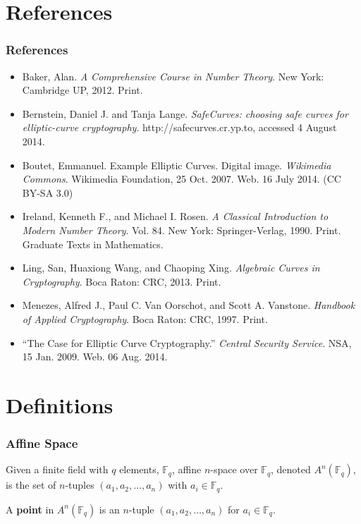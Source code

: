 \documentclass{beamer}
\begin{document}
    \section{References}
    \begin{frame}[allowframebreaks]
        \frametitle{References}
        \begin{itemize}
            \item Baker, Alan. \emph{A Comprehensive Course in Number Theory}.
                New York: Cambridge UP, 2012. Print.
            \item Bernstein, Daniel J. and Tanja Lange. \emph{SafeCurves:
                choosing safe curves for elliptic-curve cryptography}.
                http://safecurves.cr.yp.to, accessed 4 August 2014.
            \item Boutet, Emmanuel. Example Elliptic Curves. Digital image.
                \emph{Wikimedia Commons}.
                Wikimedia Foundation, 25 Oct. 2007.
                Web. 16 July 2014. (CC BY-SA 3.0)
            \item Ireland, Kenneth F., and Michael I. Rosen. \emph{A Classical
                Introduction to Modern Number Theory}. Vol. 84. New York:
                Springer-Verlag, 1990. Print. Graduate Texts in Mathematics.
            \item Ling, San, Huaxiong Wang, and Chaoping Xing. \emph{Algebraic
                Curves in Cryptography}. Boca Raton: CRC, 2013. Print.
            \item Menezes, Alfred J., Paul C. Van Oorschot, and
                Scott A. Vanstone. \emph{Handbook of Applied Cryptography}.
                Boca Raton: CRC, 1997. Print.
            \item ``The Case for Elliptic Curve Cryptography.''
                \emph{Central Security Service}.
                NSA, 15 Jan. 2009. Web. 06 Aug. 2014.
        \end{itemize}
    \end{frame}

    \appendix
    \section{Definitions}
    \begin{frame}[label=definitions]
        \frametitle{Affine Space}
        \begin{definition}
            Given a finite field with \(q\) elements, \(\mathbb{F}_q\),
            affine \(n\)-space over \(\mathbb{F}_q\), denoted
            \(A^n(\mathbb{F}_q)\), is the set of
            \(n\)-tuples \((a_1, a_2, \dots, a_n)\) with
            \(a_i \in \mathbb{F}_q.\)
        \end{definition}
        \vfill
        \begin{definition}
            A \textbf{point} in \(A^n(\mathbb{F}_q)\) is an \(n\)-tuple
            \((a_1, a_2, \dots, a_n)\) for \(a_i \in \mathbb{F}_q\).
        \end{definition}
    \end{frame}
\end{document}

